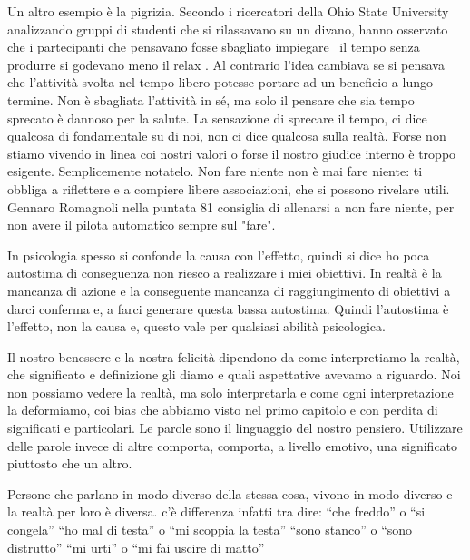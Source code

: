 \documentclass[12pt]{book} %
\begin{document}
\begin{mdframed}[linewidth=1pt]
Un altro esempio è la pigrizia. Secondo i ricercatori della Ohio State University analizzando gruppi di studenti che si
rilassavano su un divano, hanno osservato che i partecipanti che pensavano fosse sbagliato impiegare \ il tempo senza
{\textquotedbl}produrre{\textquotedbl} si godevano meno il relax . Al contrario l'idea cambiava se
si pensava che l'attività svolta nel tempo libero potesse portare ad un beneficio a lungo termine. Non è sbagliata
l'attività in sé, ma solo il pensare che sia tempo sprecato è dannoso per la salute. La sensazione
di sprecare il tempo, ci dice qualcosa di fondamentale su di noi, non ci dice qualcosa sulla realtà. Forse non stiamo
vivendo in linea coi nostri valori o forse il nostro giudice interno è troppo esigente. Semplicemente notatelo. Non
fare niente non è mai fare niente: ti obbliga a riflettere e a compiere libere associazioni, che si possono rivelare
utili. Gennaro Romagnoli nella puntata 81 consiglia di allenarsi a non fare niente, per non avere il pilota automatico sempre sul "fare".
\end{mdframed}

In psicologia spesso si confonde la causa con l'effetto, quindi si dice ho poca autostima di conseguenza non riesco a realizzare i miei obiettivi. In realtà è la mancanza di azione e la conseguente mancanza di raggiungimento di obiettivi a darci conferma e, a farci generare questa bassa autostima. Quindi l'autostima è l'effetto, non la causa e, questo vale per qualsiasi abilità psicologica.

Il nostro benessere e la nostra felicità dipendono da come interpretiamo la realtà, che significato e definizione gli
diamo e quali aspettative avevamo a riguardo. Noi non possiamo vedere la realtà, ma solo interpretarla e come ogni
interpretazione la deformiamo, coi bias che abbiamo visto nel primo capitolo e con perdita di significati e
particolari. Le parole sono il linguaggio del nostro pensiero. Utilizzare delle parole invece di altre comporta,
comporta, a livello emotivo, una significato piuttosto che un altro.

Persone che parlano in modo diverso della stessa cosa, vivono in modo diverso e la realtà per loro è diversa. c'è
differenza infatti tra dire:\newline
“che freddo” o “si congela”\newline
“ho mal di testa” o “mi scoppia la testa”\newline
“sono stanco” o “sono distrutto”\newline
“mi urti” o “mi fai uscire di matto”
\end{document}
